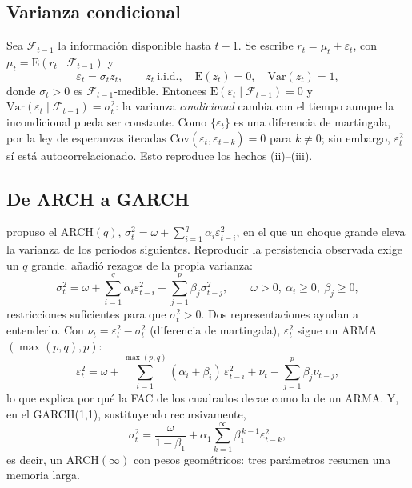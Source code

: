 \documentclass[legalpaper,11pt]{article}
\newcommand{\E}{\mathrm{E}}
\newcommand{\Var}{\mathrm{Var}}
\begin{document}
\subsection{Varianza condicional}
Sea $\mathcal{F}_{t-1}$ la información disponible hasta $t-1$. Se escribe
$r_t=\mu_t+\varepsilon_t$, con $\mu_t=\E(r_t\mid\mathcal{F}_{t-1})$ y
\begin{equation}\label{eq:eps}
\varepsilon_t=\sigma_t z_t,\qquad z_t\ \text{i.i.d.},\quad \E(z_t)=0,\quad \Var(z_t)=1,
\end{equation}
donde $\sigma_t>0$ es $\mathcal{F}_{t-1}$-medible. Entonces
$\E(\varepsilon_t\mid\mathcal{F}_{t-1})=0$ y
$\Var(\varepsilon_t\mid\mathcal{F}_{t-1})=\sigma_t^2$: la varianza \emph{condicional} cambia
con el tiempo aunque la incondicional pueda ser constante. Como $\{\varepsilon_t\}$ es una
diferencia de martingala, por la ley de esperanzas iteradas
$\mathrm{Cov}(\varepsilon_t,\varepsilon_{t+k})=0$ para $k\neq 0$; sin embargo,
$\varepsilon_t^2$ sí está autocorrelacionado. Esto reproduce los hechos (ii)--(iii).

\subsection{De ARCH a GARCH}
\citet{engle1982} propuso el ARCH$(q)$, $\sigma_t^2=\omega+\sum_{i=1}^{q}\alpha_i\varepsilon_{t-i}^2$,
en el que un choque grande eleva la varianza de los periodos siguientes. Reproducir la
persistencia observada exige un $q$ grande. \citet{bollerslev1986} añadió rezagos de la propia
varianza:
\begin{equation}\label{eq:garch}
\sigma_t^2=\omega+\sum_{i=1}^{q}\alpha_i\varepsilon_{t-i}^2+\sum_{j=1}^{p}\beta_j\sigma_{t-j}^2,
\qquad \omega>0,\ \alpha_i\ge 0,\ \beta_j\ge 0,
\end{equation}
restricciones suficientes para que $\sigma_t^2>0$. Dos representaciones ayudan a entenderlo.
Con $\nu_t=\varepsilon_t^2-\sigma_t^2$ (diferencia de martingala), $\varepsilon_t^2$ sigue un
ARMA$(\max(p,q),p)$:
\begin{equation}\label{eq:arma}
\varepsilon_t^2=\omega+\sum_{i=1}^{\max(p,q)}(\alpha_i+\beta_i)\,\varepsilon_{t-i}^2
+\nu_t-\sum_{j=1}^{p}\beta_j\nu_{t-j},
\end{equation}
lo que explica por qué la FAC de los cuadrados decae como la de un ARMA. Y, en el
GARCH(1,1), sustituyendo recursivamente,
\begin{equation}\label{eq:archinf}
\sigma_t^2=\frac{\omega}{1-\beta_1}+\alpha_1\sum_{k=1}^{\infty}\beta_1^{\,k-1}\varepsilon_{t-k}^2 ,
\end{equation}
es decir, un ARCH$(\infty)$ con pesos geométricos: tres parámetros resumen una memoria larga.
\end{document}
